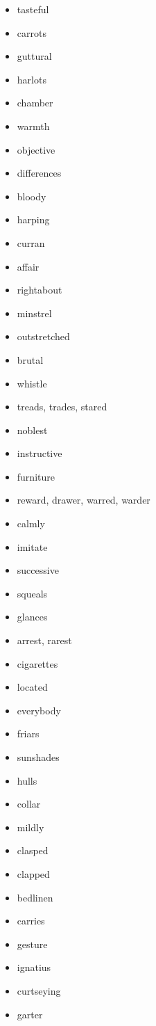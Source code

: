 \documentclass{article}
\begin{document}
\begin{itemize}
    \item tasteful
    \item carrots
    \item guttural
    \item harlots
    \item chamber
    \item warmth
    \item objective
    \item differences
    \item bloody
    \item harping
    \item curran
    \item affair
    \item rightabout
    \item minstrel
    \item outstretched
    \item brutal
    \item whistle
    \item treads, trades, stared
    \item noblest
    \item instructive
    \item furniture
    \item reward, drawer, warred, warder
    \item calmly
    \item imitate
    \item successive
    \item squeals
    \item glances
    \item arrest, rarest
    \item cigarettes
    \item located
    \item everybody
    \item friars
    \item sunshades
    \item hulls
    \item collar
    \item mildly
    \item clasped
    \item clapped
    \item bedlinen
    \item carries
    \item gesture
    \item ignatius
    \item curtseying
    \item garter

\end{itemize}
\end{document}
